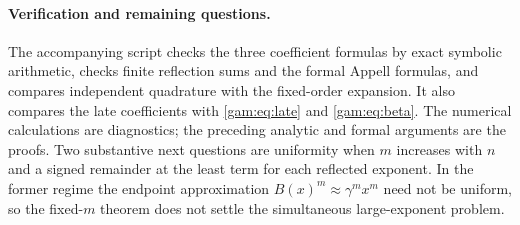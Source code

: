 \paragraph{Verification and remaining questions.}
The accompanying script  checks the
three coefficient formulas by exact symbolic arithmetic, checks finite
reflection sums and the formal Appell formulas, and compares independent
quadrature with the fixed-order expansion.  It also compares the late
coefficients with \eqref{gam:eq:late} and \eqref{gam:eq:beta}.
The numerical calculations are diagnostics; the preceding analytic and
formal arguments are the proofs.
Two substantive next questions are uniformity when $m$ increases with
$n$ and a signed remainder at the least term for each reflected exponent.
In the former regime the endpoint approximation
$B(x)^m\approx\gamma^m x^m$ need not be uniform, so the fixed-$m$
theorem does not settle the simultaneous large-exponent problem.
